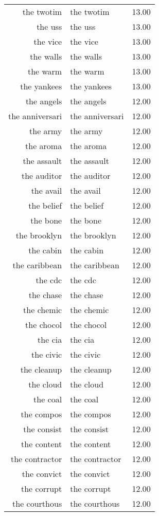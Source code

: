 \begin{table}[ht]
\begin{tabular}{rlr}
  the twotim & the twotim & 13.00 \\ 
  the uss & the uss & 13.00 \\ 
  the vice & the vice & 13.00 \\ 
  the walls & the walls & 13.00 \\ 
  the warm & the warm & 13.00 \\ 
  the yankees & the yankees & 13.00 \\ 
  the angels & the angels & 12.00 \\ 
  the anniversari & the anniversari & 12.00 \\ 
  the army & the army & 12.00 \\ 
  the aroma & the aroma & 12.00 \\ 
  the assault & the assault & 12.00 \\ 
  the auditor & the auditor & 12.00 \\ 
  the avail & the avail & 12.00 \\ 
  the belief & the belief & 12.00 \\ 
  the bone & the bone & 12.00 \\ 
  the brooklyn & the brooklyn & 12.00 \\ 
  the cabin & the cabin & 12.00 \\ 
  the caribbean & the caribbean & 12.00 \\ 
  the cdc & the cdc & 12.00 \\ 
  the chase & the chase & 12.00 \\ 
  the chemic & the chemic & 12.00 \\ 
  the chocol & the chocol & 12.00 \\ 
  the cia & the cia & 12.00 \\ 
  the civic & the civic & 12.00 \\ 
  the cleanup & the cleanup & 12.00 \\ 
  the cloud & the cloud & 12.00 \\ 
  the coal & the coal & 12.00 \\ 
  the compos & the compos & 12.00 \\ 
  the consist & the consist & 12.00 \\ 
  the content & the content & 12.00 \\ 
  the contractor & the contractor & 12.00 \\ 
  the convict & the convict & 12.00 \\ 
  the corrupt & the corrupt & 12.00 \\ 
  the courthous & the courthous & 12.00 \\ 

\end{tabular}
\end{table}
